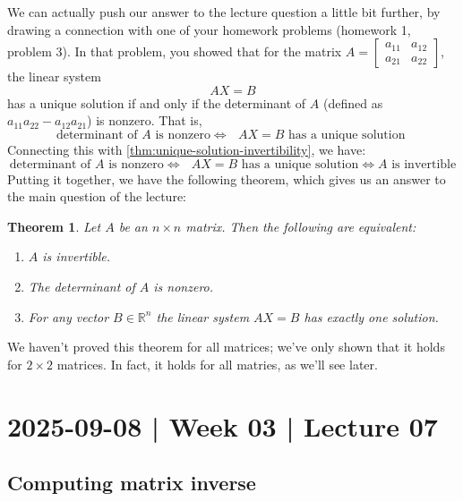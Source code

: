 \documentclass[10pt]{article}
\newtheorem{theorem}{Theorem}
\theoremstyle{definition}
\newcommand{\R}{\mathbb{R}}           %
\begin{document}
We can actually push our answer to the lecture question a little bit further,
by drawing a connection with one of your homework problems (homework 1,
problem 3). In that problem, you showed that for the matrix $A=
\begin{bmatrix}
  a_{11}&a_{12}\\
  a_{21}&a_{22}
\end{bmatrix}
$, the linear system
\begin{equation*}
  AX=B
\end{equation*}
has a unique solution if and only if the determinant of $A$ (defined as
$a_{11}a_{22}-a_{12}a_{21}$) is nonzero. That is,
\begin{equation*}
  \text{determinant of $A$ is nonzero} \iff \text{ $AX=B$ has a unique solution }
\end{equation*}
Connecting this with \cref{thm:unique-solution-invertibility}, we have:
\begin{equation*}
  \text{determinant of $A$ is nonzero} \iff \text{ $AX=B$ has a unique solution} \iff
  \text{$A$ is invertible}
\end{equation*}
Putting it together, we have the following theorem, which gives us an answer
to the main question of the lecture:
\begin{theorem}
  \label{thm:key-theorem}
  Let $A$ be an $n\times n$ matrix. Then the following are equivalent:
  \begin{enumerate}[label=(\roman*.)]
    \item $A$ is invertible.
    \item The determinant of $A$ is nonzero.
    \item For any vector $B\in\R^{n}$ the linear system $AX=B$ has exactly one solution.
  \end{enumerate}
\end{theorem}
We haven't proved this theorem for all matrices; we've only shown that it
holds for $2\times 2$ matrices. In fact, it holds for all matries, as we'll
see later.


\newpage
\section{2025-09-08 | Week 03 | Lecture 07 }
\subsection{Computing matrix inverse}
\end{document}
